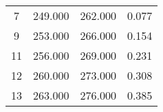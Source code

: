 % 
\begin{tabular}{cccc}
  \hline
  \hline
7 & 249.000 & 262.000 & 0.077 \\ 
  9 & 253.000 & 266.000 & 0.154 \\ 
  11 & 256.000 & 269.000 & 0.231 \\ 
  12 & 260.000 & 273.000 & 0.308 \\ 
  13 & 263.000 & 276.000 & 0.385 \\ 
   \hline
\end{tabular}
